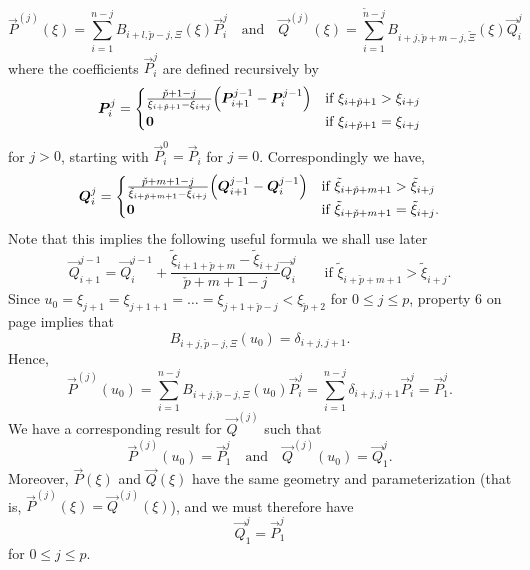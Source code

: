 \begin{equation*}
	\vec{P}^{(j)}(\xi)=\sum_{i=1}^{n-j} B_{i+l,\check{p}-j,\Xi}(\xi) \vec{P}_i^j \quad\text{and}\quad\vec{Q}^{(j)}(\xi)=\sum_{i=1}^{\tilde{n}-j} B_{i+j,\check{p}+m-j,\tilde{\Xi}}(\xi) \vec{Q}_i^j 
\end{equation*}
where the coefficients $\vec{P}_i^j$ are defined recursively by
\begin{equation}\label{Eq:coeffFormula1}
	\vec{P}_i^j = \begin{cases}\frac{\check{p}+1-j}{\xi_{i+\check{p}+1}-\xi_{i+j}}\left(\vec{P}_{i+1}^{j-1}-\vec{P}_i^{j-1}\right) & \text{if } \xi_{i+\check{p}+1} > \xi_{i+j}\\
	\zerovec & \text{if } \xi_{i+\check{p}+1} = \xi_{i+j}\end{cases}
\end{equation}
for $j>0$, starting with $\vec{P}_i^0 = \vec{P}_i$ for $j=0$. Correspondingly we have,
\begin{equation}\label{Eq:coeffFormula2}
	\vec{Q}_i^j = \begin{cases}\frac{\check{p}+m+1-j}{\tilde{\xi}_{i+\check{p}+m+1}-\tilde{\xi}_{i+j}}\left(\vec{Q}_{i+1}^{j-1}-\vec{Q}_i^{j-1}\right) & \text{if } \tilde{\xi}_{i+\check{p}+m+1} > \tilde{\xi}_{i+j}\\
	\zerovec & \text{if } \tilde{\xi}_{i+\check{p}+m+1} = \tilde{\xi}_{i+j}.\end{cases}
\end{equation}
Note that this implies the following useful formula we shall use later
\begin{equation}\label{Eq:coeffFormula6}
	\vec{Q}_{i+1}^{j-1} = \vec{Q}_i^{j-1}+ \frac{\tilde{\xi}_{i+1+\check{p}+m}-\tilde{\xi}_{i+j}}{\check{p}+m+1-j}\vec{Q}_i^j\qquad	\text{if } \tilde{\xi}_{i+\check{p}+m+1} > \tilde{\xi}_{i+j}.
\end{equation}
Since $u_0=\xi_{j+1}=\xi_{j+1+1}=\dots=\xi_{j+1+\check{p}-j}< \xi_{\check{p}+2}$ for $0\leq j\leq p$, property 6 on page \pageref{List:properties} implies that
\begin{equation*}
	B_{i+j,\check{p}-j,\Xi}(u_0) = \delta_{i+j,j+1}.
\end{equation*}
Hence, 
\begin{equation*}
	\vec{P}^{(j)}(u_0)=\sum_{i=1}^{n-j} B_{i+j,\check{p}-j,\Xi}(u_0) \vec{P}_i^j=\sum_{i=1}^{n-j} \delta_{i+j,j+1} \vec{P}_i^j = \vec{P}_1^j.
\end{equation*}
We have a corresponding result for $\vec{Q}^{(j)}$ such that
\begin{equation*}
	\vec{P}^{(j)}(u_0) = \vec{P}_1^j\quad\text{and}\quad\vec{Q}^{(j)}(u_0) = \vec{Q}_1^j.
\end{equation*}
Moreover, $\vec{P}(\xi)$ and $\vec{Q}(\xi)$ have the same geometry and parameterization (that is, ${\vec{P}^{(j)}(\xi)=\vec{Q}^{(j)}(\xi)}$), and we must therefore have
\begin{equation}\label{Eq:coeffFormula3}
	\vec{Q}_1^j = \vec{P}_1^j
\end{equation}
for $0\leq j\leq p$. 

